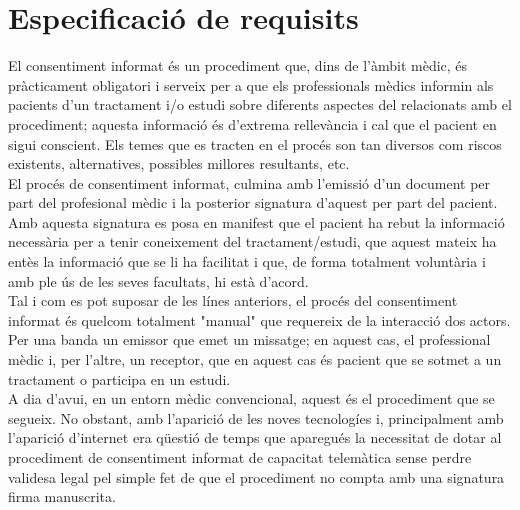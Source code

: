 \section{Especificació de requisits}

El consentiment informat és un procediment que, dins de l'àmbit mèdic, és pràcticament obligatori i serveix per a que els professionals mèdics informin als pacients d'un tractament i/o estudi sobre diferents aspectes del relacionats amb el procediment; aquesta informació és d'extrema rellevància i cal que el pacient en sigui conscient. Els temes que es tracten en el procés son tan diversos com riscos existents, alternatives, possibles millores resultants, etc.\\
\newline El procés de consentiment informat, culmina amb l'emissió d'un document per part del profesional mèdic i la posterior signatura d'aquest per part del pacient.\\
Amb aquesta signatura es posa en manifest que el pacient ha rebut la informació necessària per a tenir coneixement del tractament/estudi, que aquest mateix ha entès la informació que se li ha facilitat i que, de forma totalment voluntària i amb ple ús de les seves facultats, hi està d'acord.\\
\newline Tal i com es pot suposar de les línes anteriors, el procés del consentiment informat és quelcom totalment "manual" que requereix de la interacció dos actors.\\
Per una banda un emissor que emet un missatge; en aquest cas, el professional mèdic i, per l'altre, un receptor, que en aquest cas és pacient que se sotmet a un tractament o participa en un estudi.\\
\newline A dia d'avui, en un entorn mèdic convencional, aquest és el procediment que se segueix. No obstant, amb l'aparició de les noves tecnologíes i, principalment amb l'aparició d'internet era qüestió de temps que aparegués la necessitat de dotar al procediment de consentiment informat de capacitat telemàtica sense perdre validesa legal pel simple fet de que el procediment no compta amb una signatura firma manuscrita.\\
